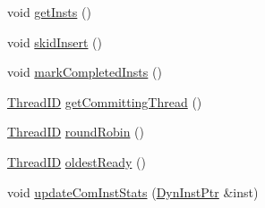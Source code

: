 \begin{DoxyCompactItemize}
\item 
void \hyperlink{classDefaultCommit_a8d0c39182cb7719942e865bcaaff769b}{getInsts} ()
\item 
void \hyperlink{classDefaultCommit_affce029fbba116bb863eb2a3a7a5bb48}{skidInsert} ()
\item 
void \hyperlink{classDefaultCommit_a035349a9fd8a12938e7997be5a76211e}{markCompletedInsts} ()
\item 
\hyperlink{base_2types_8hh_ab39b1a4f9dad884694c7a74ed69e6a6b}{ThreadID} \hyperlink{classDefaultCommit_ad313fd14604cfa26fec9c62dba3a7062}{getCommittingThread} ()
\item 
\hyperlink{base_2types_8hh_ab39b1a4f9dad884694c7a74ed69e6a6b}{ThreadID} \hyperlink{classDefaultCommit_a8aab9cacbc483081596b13ecd5192eb5}{roundRobin} ()
\item 
\hyperlink{base_2types_8hh_ab39b1a4f9dad884694c7a74ed69e6a6b}{ThreadID} \hyperlink{classDefaultCommit_a7b2c5e474b4fd5c54395b44f3b792d21}{oldestReady} ()
\item 
void \hyperlink{classDefaultCommit_a5bbf266cb0cc97eed138c8fe0d2d76b6}{updateComInstStats} (\hyperlink{classDefaultCommit_a028ce10889c5f6450239d9e9a7347976}{DynInstPtr} \&inst)
\end{DoxyCompactItemize}
